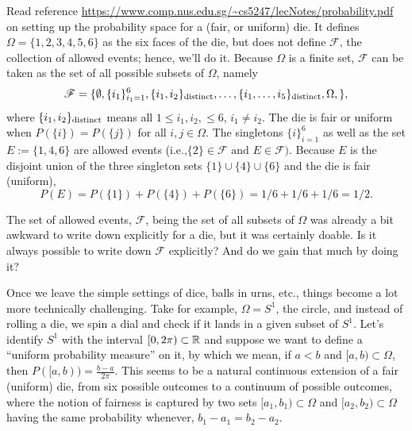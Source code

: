 \begin{example} Read reference {\small  \url{https://www.comp.nus.edu.sg/~cs5247/lecNotes/probability.pdf} } on setting up the probability space for a (fair, or uniform) die. It defines $\Omega = \{ 1, 2, 3, 4, 5, 6\}$ as the six faces of the die, but does not define $\mathscr{F}$, the collection of allowed events; hence, we'll do it. Because $\Omega$ is a finite set, $\mathscr{F}$ can be taken as the set of all possible subsets of $\Omega$, namely
$$\mathscr{F} = \{ \emptyset, \{i_1\}_{i_1=1}^6, \{i_1, i_2\}_{\text{\rm distinct}}, \ldots, \{ i_1, \ldots, i_5 \}_{\text{\rm distinct}}, \Omega,  \},$$
where $\{i_1, i_2\}_{\text{\rm distinct}}$ means all $1 \le i_1, i_2, \le 6$, $i_1 \neq i_2$. The die is fair or uniform when $P(\{i\})=P(\{j\})$ for all $i,j \in \Omega$. The singletons $\{i\}_{i=1}^6$ as well as the set $E:=\{1, 4, 6\}$ are allowed events (i.e.,$ \{2\} \in  \mathscr{F}  \text{ and } E \in \mathscr{F})$. Because $E$ is the disjoint union of the three singleton sets $\{1\} \cup \{ 4\} \cup \{6\}$ and the die is fair (uniform), 
$$P(E) = P(\{1\}) + P(\{4\}) +  P(\{6\}) = 1/6 + 1/6 + 1/6 = 1/2.$$ 
\Qed
\end{example}

\begin{question} The set of allowed events, $\mathscr{F}$, being the set of all subsets of $\Omega$ was already a bit awkward to write down explicitly for a die, but it was certainly doable. Is it always possible to write down $\mathscr{F}$ explicitly? And do we gain that much by doing it? 
\end{question}

Once we leave the simple settings of dice, balls in urns, etc., things become a lot more technically challenging. Take for example, $\Omega = S^1$, the circle, and instead of rolling a die, we spin a dial and check if it lands in a given subset of $S^1$. Let's identify $S^1$ with the interval $[0, 2 \pi) \subset \mathbb R$ and suppose we want to define a ``uniform probability measure'' on it, by which we mean, if  $a < b$ and $[a, b) \subset \Omega $, then $P([a, b))=\frac{b-a}{2 \pi}$. This seems to be a natural continuous extension of a fair (uniform) die, from six possible outcomes to a continuum of possible outcomes, where the notion of fairness is captured by two sets $[a_1, b_1) \subset \Omega$ and $[a_2, b_2) \subset \Omega$ having the same probability whenever, $b_1-a_1 = b_2 - a_2$. \\

